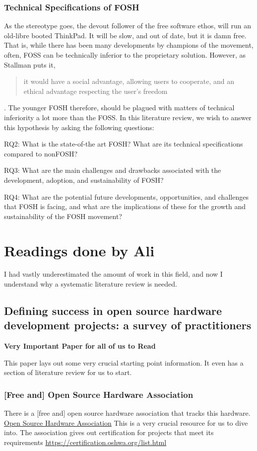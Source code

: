 \documentclass{article}
\begin{document}
\subsubsection{Technical Specifications of FOSH}
As the stereotype goes, the devout follower of the free software ethos, will run an old-libre booted ThinkPad.
It will be slow, and out of date, but it is damn free. 
That is, while there has been many developments by champions of the movement, often, FOSS can be technically inferior to the proprietary solution. 
However, as Stallman puts it, 
\begin{quote}
it would have a social advantage, allowing users to cooperate, and an ethical advantage respecting the user's freedom 
\end{quote}
\cite{b0_stallman}.
The younger FOSH therefore, should be plagued with matters of technical inferiority a lot more than the FOSS. 
In this literature review, we wish to answer this hypothesis by asking the following questions:

RQ2: What is the state-of-the art FOSH? What are its technical specifications compared to nonFOSH? 

RQ3: What are the main challenges and drawbacks associated with the development, adoption, and sustainability of FOSH?

RQ4: What are the potential future developments, opportunities, and challenges that FOSH is facing, and what are the implications of these for the growth and sustainability of the FOSH movement?

\section{Readings done by Ali}

I had vastly underestimated the amount of work in this field, and now I understand why a systematic literature review is needed.

\subsection{Defining success in open source hardware development projects: a survey of practitioners}
\cite{p1_def_succ}

\textbf{Very Important Paper for all of us to Read}

This paper lays out some very crucial starting point information.
It even has a section of literature review for us to start.

\subsubsection{[Free and] Open Source Hardware Association}
There is a [free and] open source hardware association that tracks this hardware.
\href{https://www.oshwa.org}{Open Source Hardware Association}
This is a very crucial resource for us to dive into. 
The association gives out certification for projects that meet its requirements
\href{https://certification.oshwa.org/list.html}{https://certification.oshwa.org/list.html}
\end{document}
